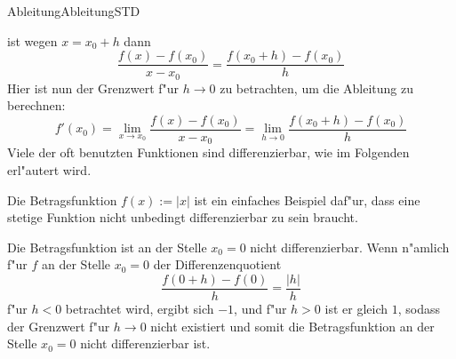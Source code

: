 \begin{MXContent}{Ableitung}{Ableitung}{STD}
\begin{center}
\ifttm
{}
\else
\begin{small}
\renewcommand{\jTikZScale}{0.7}
\end{small}
\fi
\end{center}

ist wegen $x = x_0 + h$ dann
\[
\frac{f(x) - f(x_0)}{x - x_0} = \frac{f(x_0 + h) - f(x_0)}{h}
\]
Hier ist nun der Grenzwert f"ur $h \to 0$ zu betrachten, um die Ableitung zu
berechnen: 
\[
f'(x_0) = \lim_{x \to x_0} \frac{f(x) - f(x_0)}{x - x_0} %
 = \lim_{h \to 0} \frac{f(x_0 + h) - f(x_0)}{h}
\]
Viele der oft benutzten Funktionen sind differenzierbar, wie im Folgenden 
erl"autert wird. 

Die Betragsfunktion $f(x) := |x|$ ist ein einfaches Beispiel 
daf"ur, dass eine stetige Funktion nicht unbedingt differenzierbar zu sein 
braucht. 

\begin{MExample}
Die Betragsfunktion ist an der Stelle $x_0 = 0$ nicht differenzierbar.
Wenn n"amlich f"ur $f$ an der Stelle $x_0 = 0$ der Differenzenquotient
\[
\frac{f(0+h) - f(0)}{h} = \frac{|h|}{h}
\]
f"ur $h < 0$ betrachtet wird, ergibt sich $-1$, und f"ur $h > 0$ ist er 
gleich $1$, sodass der Grenzwert f"ur $h \to 0$ nicht existiert und somit die 
Betragsfunktion an der Stelle $x_0 = 0$ nicht differenzierbar ist.


\end{MExample}
\end{MXContent}
